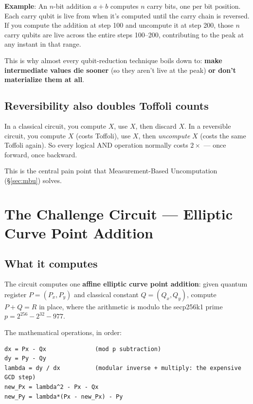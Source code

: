\documentclass[11pt,a4paper]{article}
\newcommand{\tof}{Toffoli\xspace}
\begin{document}
\textbf{Example}: An $n$-bit addition $a + b$ computes $n$ carry bits, one per bit position. Each
carry qubit is live from when it's computed until the carry chain is reversed. If you compute the
addition at step 100 and uncompute it at step 200, those $n$ carry qubits are live across the
entire steps 100--200, contributing to the peak at any instant in that range.

This is why almost every qubit-reduction technique boils down to:
\textbf{make intermediate values die sooner} (so they aren't live at the peak) \textbf{or don't
materialize them at all}.

\subsection{Reversibility also doubles Toffoli counts}

In a classical circuit, you compute $X$, use $X$, then discard $X$. In a reversible circuit, you
compute $X$ (costs \tof), use $X$, then \emph{uncompute} $X$ (costs the same \tof again). So
every logical AND operation normally costs $2\times$ --- once forward, once backward.

This is the central pain point that Measurement-Based Uncomputation (\S\ref{sec:mbu}) solves.

\section{The Challenge Circuit --- Elliptic Curve Point Addition}
\label{sec:circuit}

\subsection{What it computes}

The circuit computes one \textbf{affine elliptic curve point addition}: given quantum register
$P = (P_x, P_y)$ and classical constant $Q = (Q_x, Q_y)$, compute $P + Q = R$ in place, where
the arithmetic is modulo the secp256k1 prime $p = 2^{256} - 2^{32} - 977$.

The mathematical operations, in order:
\begin{lstlisting}
dx = Px - Qx              (mod p subtraction)
dy = Py - Qy
lambda = dy / dx          (modular inverse + multiply: the expensive GCD step)
new_Px = lambda^2 - Px - Qx
new_Py = lambda*(Px - new_Px) - Py
\end{lstlisting}
\end{document}
